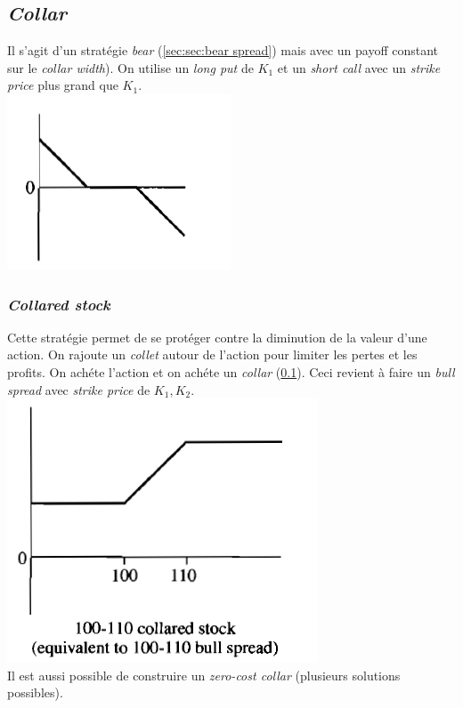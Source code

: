 \documentclass[11pt,french]{report}
\begin{document}
\subsection{\emph{Collar}}
\label{sec:sec:Collar}

Il s'agit d'un stratégie \emph{bear} (\ref{sec:sec:bear spread}) mais avec un payoff constant sur le \emph{collar width}). On utilise un \emph{long put} de $K_1$ et un \emph{short call} avec un \emph{strike price} plus grand que $K_1$.
\\
\includegraphics[scale=0.45]{picture36.PNG}

\subsubsection{\emph{Collared stock}}
\label{sec:sec:sec:collared stock}

Cette stratégie permet de se protéger contre la diminution de la valeur d'une action. On rajoute un \textit{collet} autour de l'action pour limiter les pertes et les profits. On achéte l'action et on achéte un \emph{collar} (\ref{sec:sec:Collar}). Ceci revient à faire un \emph{bull spread} avec \emph{strike price} de $K_1, K_2$.
\\
\includegraphics[scale=0.45]{picture37.PNG}
\\
Il est aussi possible de construire un \emph{zero-cost collar} (plusieurs solutions possibles).
\end{document}
